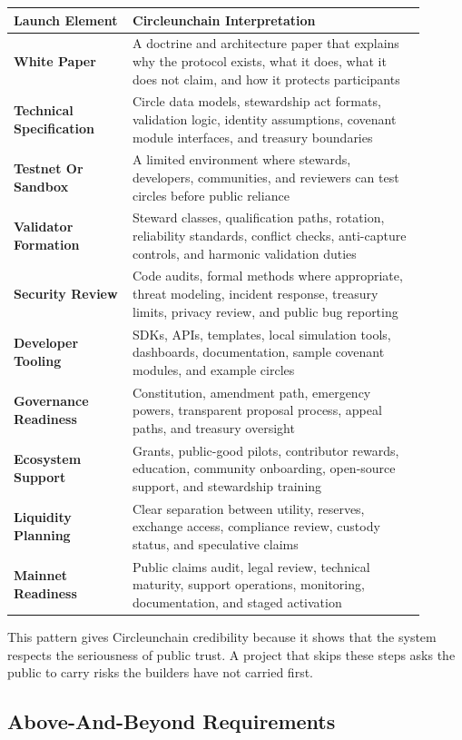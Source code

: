 \documentclass[12pt]{article}
\begin{document}
\begin{longtable}{>{\bfseries}p{0.26\linewidth}p{0.64\linewidth}}
\toprule
Launch Element & Circleunchain Interpretation \\
\midrule
White Paper & A doctrine and architecture paper that explains why the protocol exists, what it does, what it does not claim, and how it protects participants \\
Technical Specification & Circle data models, stewardship act formats, validation logic, identity assumptions, covenant module interfaces, and treasury boundaries \\
Testnet Or Sandbox & A limited environment where stewards, developers, communities, and reviewers can test circles before public reliance \\
Validator Formation & Steward classes, qualification paths, rotation, reliability standards, conflict checks, anti-capture controls, and harmonic validation duties \\
Security Review & Code audits, formal methods where appropriate, threat modeling, incident response, treasury limits, privacy review, and public bug reporting \\
Developer Tooling & SDKs, APIs, templates, local simulation tools, dashboards, documentation, sample covenant modules, and example circles \\
Governance Readiness & Constitution, amendment path, emergency powers, transparent proposal process, appeal paths, and treasury oversight \\
Ecosystem Support & Grants, public-good pilots, contributor rewards, education, community onboarding, open-source support, and stewardship training \\
Liquidity Planning & Clear separation between utility, reserves, exchange access, compliance review, custody status, and speculative claims \\
Mainnet Readiness & Public claims audit, legal review, technical maturity, support operations, monitoring, documentation, and staged activation \\
\bottomrule
\end{longtable}

This pattern gives Circleunchain credibility because it shows that the system respects the seriousness of public trust. A project that skips these steps asks the public to carry risks the builders have not carried first.

\subsection{Above-And-Beyond Requirements}
\end{document}
